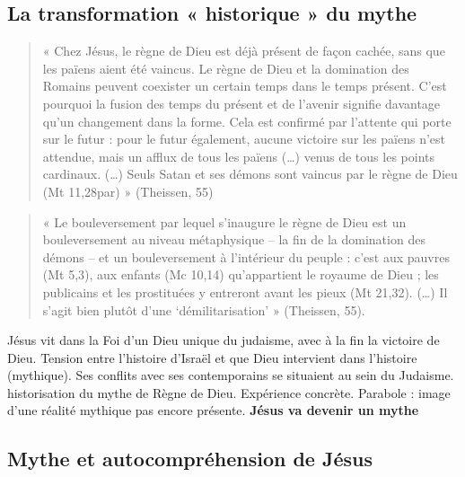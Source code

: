 \subsection{La transformation « historique » du mythe}



\begin{quote}
    « Chez Jésus, le règne de Dieu est déjà présent de façon cachée, sans
que les païens aient été vaincus. Le règne de Dieu et la domination des
Romains peuvent coexister un certain temps dans le temps présent. C'est
pourquoi la fusion des temps du présent et de l'avenir signifie
davantage qu'un changement dans la forme. Cela est confirmé par
l'attente qui porte sur le futur : pour le futur également, aucune
victoire sur les païens n'est attendue, mais un afflux de tous les
païens (\ldots) venus de tous les points cardinaux. (\ldots) Seuls Satan
et ses démons sont vaincus par le règne de Dieu (Mt 11,28par) »
(Theissen, 55)
\end{quote}

\begin{quote}
    « Le bouleversement par lequel s'inaugure le règne de Dieu est un
bouleversement au niveau métaphysique -- la fin de la domination des
démons -- et un bouleversement à l'intérieur du peuple : c'est aux
pauvres (Mt 5,3), aux enfants (Mc 10,14) qu'appartient le royaume de
Dieu ; les publicains et les prostituées y entreront avant les pieux (Mt
21,32). (\ldots) Il s'agit bien plutôt d'une `démilitarisation' »
(Theissen, 55).
\end{quote}



\begin{Synthesis}
Jésus vit dans la Foi d'un Dieu unique du judaisme, avec à la fin la victoire de Dieu. Tension entre l'histoire d'Israël et que Dieu intervient dans l'histoire (mythique). Ses conflits avec ses contemporains se situaient au sein du Judaisme. 
historisation du mythe de Règne de Dieu. Expérience concrète. Parabole : image d'une réalité mythique pas encore présente. 
\textbf{Jésus va devenir un mythe}
\end{Synthesis}

\subsection{Mythe et autocompréhension de Jésus}

